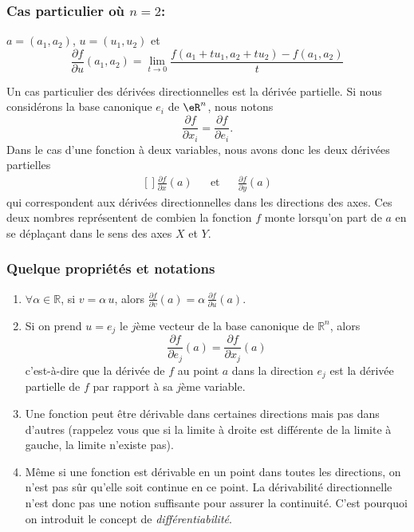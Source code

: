 \subsubsection*{Cas particulier où $n=2$:} $a = (a_1, a_2)$, $u =
(u_1,u_2)$ et
$$\frac{\partial f}{\partial u}(a_1, a_2) = \lim_{t\rightarrow
0}\frac{f(a_1+tu_1,a_2+tu_2) - f(a_1, a_2)}{t}$$

Un cas particulier des dérivées directionnelles est la dérivée partielle. Si nous considérons la base canonique $e_i$ de $\eR^n$, nous notons
\begin{equation}
    \frac{ \partial f }{ \partial x_i }=\frac{ \partial f }{ \partial e_i }.
\end{equation}
Dans le cas d'une fonction à deux variables, nous avons donc les deux dérivées partielles
\begin{equation}
    \begin{aligned}[]
        \frac{ \partial f }{ \partial x }(a)&&\text{et}&&\frac{ \partial f }{ \partial y }(a)
    \end{aligned}
\end{equation}
qui correspondent aux dérivées directionnelles dans les directions des axes. Ces deux nombres représentent de combien la fonction $f$ monte lorsqu'on part de $a$ en se déplaçant dans le sens des axes $X$ et $Y$.

                    \subsubsection{Quelque propriétés et notations}

\begin{enumerate}
\item
 $\forall \alpha \in \mathbb{R}$,
si $v = \alpha\,u$, alors $\frac{\partial f}{\partial v}(a) =
\alpha\,\frac{\partial f}{\partial u}(a)$.
\item Si on prend $u=e_j$ le $j$ème vecteur de la base canonique de
$\mathbb{R}^n$, alors
$$\frac{\partial f}{\partial e_j}(a) = \frac{\partial f}{\partial
x_j}(a)$$ c'est-à-dire que la dérivée de $f$ au point $a$ dans la
direction $e_j$ est la dérivée partielle de $f$ par rapport à sa
$j$ème variable.

\item 
Une fonction peut être dérivable dans certaines directions
mais pas dans d'autres (rappelez vous que si la limite à droite est
différente de la limite à gauche, la limite n'existe pas). 

\item
Même si une fonction est dérivable en un point dans toutes les
directions, on n'est pas sûr qu'elle soit continue en ce point. La
dérivabilité directionnelle n'est donc pas une notion suffisante
pour assurer la continuité. C'est pourquoi on introduit le concept
de \emph{différentiabilité}. 
\end{enumerate}

